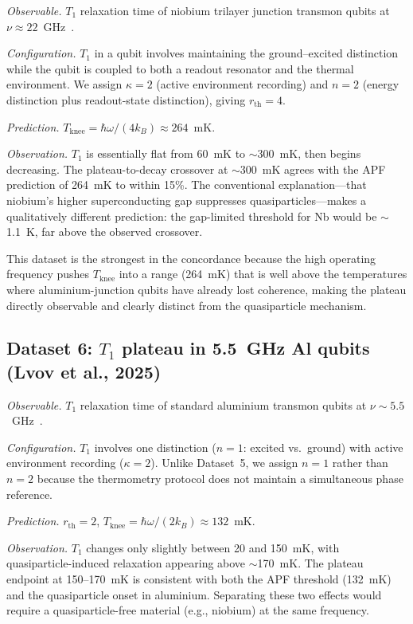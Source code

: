 \documentclass[11pt]{article}
\begin{document}
\textit{Observable.}  $T_1$ relaxation time of niobium trilayer junction transmon qubits at $\nu \approx 22$~GHz~\cite{Anferov2024}.

\textit{Configuration.}  $T_1$ in a qubit involves maintaining the ground--excited distinction while the qubit is coupled to both a readout resonator and the thermal environment.  We assign $\kappa = 2$ (active environment recording) and $n = 2$ (energy distinction plus readout-state distinction), giving $r_{\mathrm{th}} = 4$.

\textit{Prediction.}  $T_{\mathrm{knee}} = \hbar\omega / (4k_B) \approx 264$~mK.

\textit{Observation.}  $T_1$ is essentially flat from 60~mK to $\sim$300~mK, then begins decreasing.  The plateau-to-decay crossover at $\sim$300~mK agrees with the APF prediction of 264~mK to within 15\%.  The conventional explanation---that niobium's higher superconducting gap suppresses quasiparticles---makes a qualitatively different prediction: the gap-limited threshold for Nb would be $\sim$1.1~K, far above the observed crossover.

This dataset is the strongest in the concordance because the high operating frequency pushes $T_{\mathrm{knee}}$ into a range (264~mK) that is well above the temperatures where aluminium-junction qubits have already lost coherence, making the plateau directly observable and clearly distinct from the quasiparticle mechanism.

\subsection{Dataset 6: $T_1$ plateau in 5.5~GHz Al qubits (Lvov et al., 2025)}

\textit{Observable.}  $T_1$ relaxation time of standard aluminium transmon qubits at $\nu \sim 5.5$~GHz~\cite{Lvov2025}.

\textit{Configuration.}  $T_1$ involves one distinction ($n = 1$: excited vs.\ ground) with active environment recording ($\kappa = 2$).  Unlike Dataset~5, we assign $n = 1$ rather than $n = 2$ because the thermometry protocol does not maintain a simultaneous phase reference.

\textit{Prediction.}  $r_{\mathrm{th}} = 2$, $T_{\mathrm{knee}} = \hbar\omega / (2k_B) \approx 132$~mK.

\textit{Observation.}  $T_1$ changes only slightly between 20 and 150~mK, with quasiparticle-induced relaxation appearing above $\sim$170~mK.  The plateau endpoint at 150--170~mK is consistent with both the APF threshold (132~mK) and the quasiparticle onset in aluminium.  Separating these two effects would require a quasiparticle-free material (e.g., niobium) at the same frequency.
\end{document}
